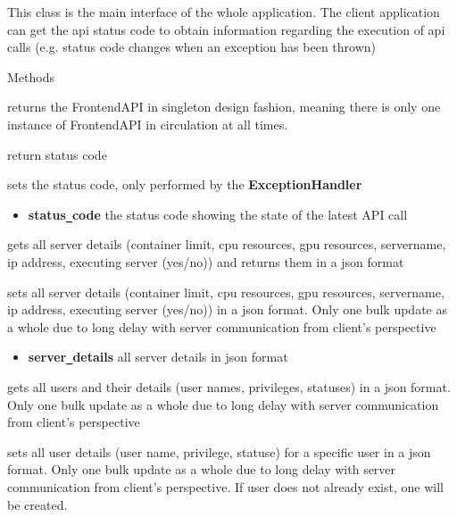 This class is the main interface of the whole application. The client application
can get the api status code to obtain information regarding the execution of api calls (e.g. status code
changes when an exception has been thrown)

\begin{methodenv}{Methods}

 returns the FrontendAPI in singleton design fashion, meaning 
there is only one instance of FrontendAPI in circulation at all times.

 return status code  

sets the status code, only performed by the \textbf{ExceptionHandler}
\begin{itemize}
        \item \textbf{status\texttt{\_}code}
        the status code showing the state of the latest API call
\end{itemize}

gets all server details (container limit, cpu resources, gpu resources, servername, ip address, executing server (yes/no)) 
and returns them in a json format 

sets all server details (container limit, cpu resources, gpu resources, servername, ip address, executing server (yes/no)) in
 a json format. Only one bulk update as a whole
due to long delay with server communication from client's perspective
\begin{itemize}
        \item \textbf{server\texttt{\_}details}
        all server details in json format
\end{itemize}

gets all users and their details (user names, privileges, statuses) in a json format. Only one bulk update as a whole
due to long delay with server communication from client's perspective


sets all user details (user name, privilege, statuse) for a specific user in a json format. Only one bulk update as a whole
due to long delay with server communication from client's perspective. If user does not already exist, one will be created.


\end{methodenv}
